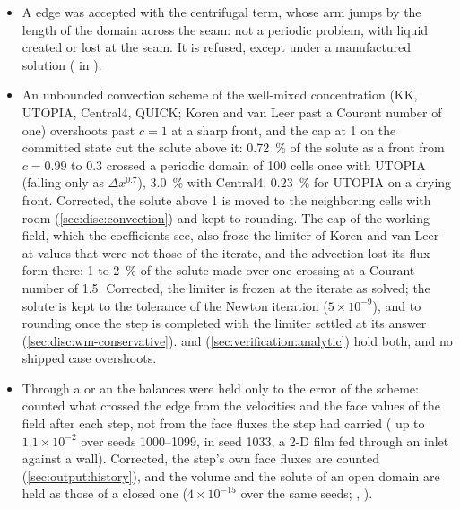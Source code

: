 \begin{itemize}
    $10^{-11}$ the property then allowed). The step puts the linear solver's
    residual back into the solute as a uniform shift of the change
    (\cref{sec:disc:cz-conservative}); the shift moves the solvent the
    surface term takes out as well, and the size it was given left a quarter
    of the residual in the solute. Across a  seam, where each
    side forms the flux from its own ghost, the ghosts of the change held
    their copies only to the solver's residual, which the shift did not
    see. Corrected, the solute of the 147 closed  films among
    500 seeds is kept to $2.4\times10^{-14}$, the limited schemes included,
    and the property asks for $10^{-13}$.
  \item A  edge was accepted with the centrifugal term, whose
    arm jumps by the length of the domain across the seam: not a periodic
    problem, with liquid created or lost at the seam. It is refused, except
    under a manufactured solution ( in
    ).
  \item An unbounded convection scheme of the well-mixed concentration
    (KK, UTOPIA, Central4, QUICK; Koren and van Leer past a Courant number
    of one) overshoots past $c = 1$ at a sharp front, and the cap at 1 on the
    committed state cut the solute above it: \SI{0.72}{\percent} of the
    solute as a front from $c = 0.99$ to 0.3 crossed a periodic domain of
    100 cells once with UTOPIA (falling only as $\Delta x^{0.7}$),
    \SI{3.0}{\percent} with Central4, \SI{0.23}{\percent} for UTOPIA on a
    drying front. Corrected, the solute above 1 is moved to the neighboring
    cells with room (\cref{sec:disc:convection}) and kept to rounding. The
    cap of the working field, which the coefficients see, also froze the
    limiter of Koren and van Leer at values that were not those of the
    iterate, and the advection lost its flux form there: 1 to
    \SI{2}{\percent} of the solute made over one crossing at a Courant
    number of 1.5. Corrected, the limiter
    is frozen at the iterate as solved; the solute is kept to the tolerance
    of the Newton iteration ($5\times10^{-9}$), and to rounding once the
    step is completed with the limiter settled at its answer
    (\cref{sec:disc:wm-conservative}).  and
     (\cref{sec:verification:analytic}) hold
    both, and no shipped case overshoots.
  \item Through a  or an  the balances were
    held only to the error of the scheme:  counted what
    crossed the edge from the velocities and the face values of the field
    after each step, not from the face fluxes the step had carried
    ( up to $1.1\times10^{-2}$ over seeds 1000--1099, in
    seed 1033, a 2-D film fed through an inlet against a wall). Corrected, the
    step's own face fluxes are counted (\cref{sec:output:history}), and the
    volume and the solute of an open domain are held as those of a closed
    one ($4\times10^{-15}$ over the same seeds; ,
    ).
\end{itemize}

